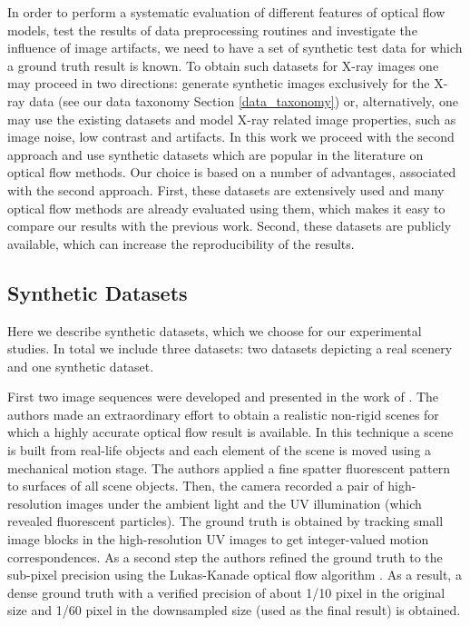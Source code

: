 In order to perform a systematic evaluation of different features of optical flow models, test the results of  data preprocessing routines and investigate the influence of image artifacts, we need to have a set of synthetic test data for which a ground truth result is known.
To obtain such datasets for X-ray images one may proceed in two directions: generate synthetic images exclusively for the X-ray data (see our data taxonomy Section \ref{data_taxonomy}) or, alternatively, one may use the existing datasets and model X-ray related image properties, such as image noise, low contrast and artifacts. 
In this work we proceed with the second approach and use synthetic datasets which are popular in the literature on optical flow methods. Our choice is based on a number of advantages, associated with the second approach. First, these datasets are extensively used and many optical flow methods are already evaluated using them, which makes it easy to compare our results with the previous work. Second, these datasets are publicly available, which can increase the reproducibility of the results. 


  

  

\subsection{Synthetic Datasets}
\label{synthetic_data}

Here we describe synthetic datasets, which we choose for our experimental studies. In total we include three datasets: two datasets depicting a real scenery and one synthetic dataset.

First two image sequences were developed and presented in the work of \cite{Middl}.  The authors made an extraordinary effort to obtain a realistic non-rigid scenes for which a highly accurate optical flow result is available.  In this technique a scene is built from real-life objects and each element of the scene is moved using a mechanical motion stage. The authors applied a fine spatter fluorescent pattern to surfaces of all scene objects. Then, the camera recorded a pair of high-resolution images under the ambient light and the UV illumination (which revealed fluorescent particles). 
The ground truth is obtained by tracking small image blocks in the high-resolution UV images to get integer-valued motion correspondences. As a second step the authors refined the ground truth to the sub-pixel precision using the Lukas-Kanade optical flow algorithm \cite{LucasKanade81}. As a result, a dense ground truth with a verified precision of about 1/10 pixel in the original size and 1/60 pixel in the downsampled size (used as the final result) is obtained.

